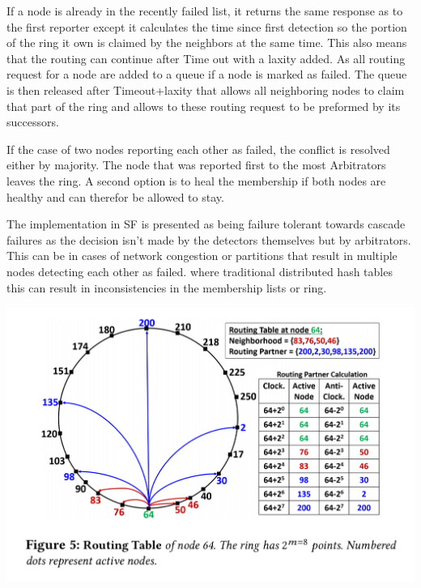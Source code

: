 \documentclass[a4paper,10pt,titlepage]{report}
\begin{document}
    If a node is already in the recently failed list, it returns the same response as to the first reporter except it calculates the time since first detection so the portion of the ring it own is claimed by the neighbors at the same time. This also means that the routing can continue after Time out with a laxity added. As all routing request for a node are added to a queue if a node is marked as failed. The queue is then released after Timeout+laxity that allows all neighboring nodes to claim that part of the ring and allows to these routing request to be preformed by its successors.\\
    \vspace{5mm}

    If the case of two nodes reporting each other as failed, the conflict is resolved either by majority. The node that was reported first to the most Arbitrators leaves the ring. A second option is to heal the membership if both nodes are healthy and can therefor be allowed to stay. \\   \vspace{5mm}
    
    The implementation in SF is presented as being failure tolerant towards cascade failures as the decision isn't made by the detectors themselves but by arbitrators.
    This can be in cases of network congestion or partitions that result in multiple nodes detecting each other as failed. where traditional distributed hash tables this can result in inconsistencies in the membership lists or ring.\\ 
    \vspace{5mm}

    \includegraphics[scale=0.3]{images/servicefabric-fig-ring-topology.jpeg}
\end{document}
